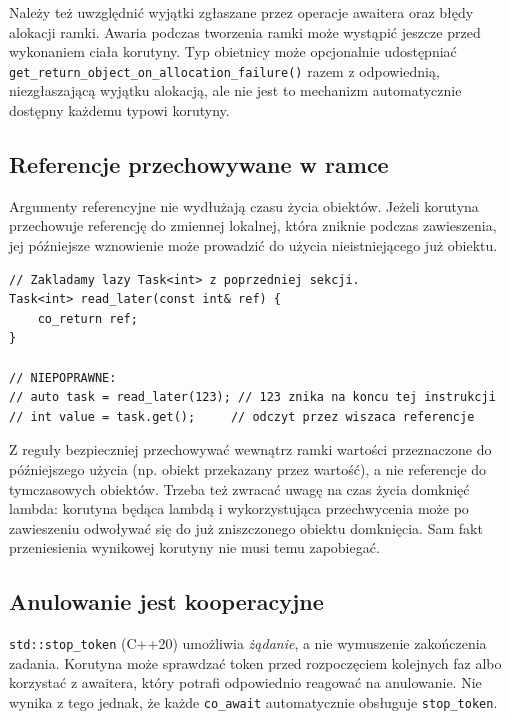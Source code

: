 Należy też uwzględnić wyjątki zgłaszane przez operacje awaitera
oraz błędy alokacji ramki. Awaria podczas tworzenia ramki może
wystąpić jeszcze przed wykonaniem ciała korutyny. Typ obietnicy
może opcjonalnie udostępniać \texttt{get\_return\_object\_on\_allocation\_failure()}
razem z odpowiednią, niezgłaszającą wyjątku alokacją, ale nie jest to
mechanizm automatycznie dostępny każdemu typowi korutyny.

\subsection{Referencje przechowywane w ramce}

Argumenty referencyjne nie wydłużają czasu życia obiektów.
Jeżeli korutyna przechowuje referencję do zmiennej lokalnej, która
zniknie podczas zawieszenia, jej późniejsze wznowienie może prowadzić
do użycia nieistniejącego już obiektu.

\begin{lstlisting}[caption={Niebezpieczny czas życia referencji w korutynie; fragment koncepcyjny.}]
// Zakladamy lazy Task<int> z poprzedniej sekcji.
Task<int> read_later(const int& ref) {
    co_return ref;
}

// NIEPOPRAWNE:
// auto task = read_later(123); // 123 znika na koncu tej instrukcji
// int value = task.get();     // odczyt przez wiszaca referencje
\end{lstlisting}

Z reguły bezpieczniej przechowywać wewnątrz ramki wartości
przeznaczone do późniejszego użycia (np. obiekt przekazany przez
wartość), a nie referencje do tymczasowych obiektów.
Trzeba też zwracać uwagę na czas życia domknięć lambda:
korutyna będąca lambdą i wykorzystująca przechwycenia może
po zawieszeniu odwoływać się do już zniszczonego obiektu domknięcia.
Sam fakt przeniesienia wynikowej korutyny nie musi temu zapobiegać.

\subsection{Anulowanie jest kooperacyjne}

\texttt{std::stop\_token} (C++20) umożliwia \emph{żądanie}, a nie
wymuszenie zakończenia zadania. Korutyna może sprawdzać token
przed rozpoczęciem kolejnych faz albo korzystać z awaitera,
który potrafi odpowiednio reagować na anulowanie. Nie wynika
z tego jednak, że każde \texttt{co\_await} automatycznie obsługuje
\texttt{stop\_token}.

